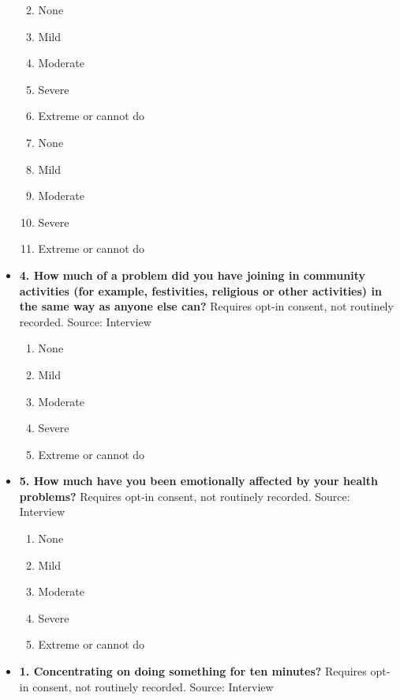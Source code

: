 \documentclass[
]{scrartcl}
\providecommand{\tightlist}{%
  \setlength{\itemsep}{0pt}\setlength{\parskip}{0pt}}\usepackage{longtable,booktabs,array}
\begin{document}
\begin{itemize}
  \begin{enumerate}
  \def\labelenumi{\arabic{enumi}.}
  \tightlist
  \item
    None
  \item
    Mild
  \item
    Moderate
  \item
    Severe
  \item
    Extreme or cannot do
  \item
    None
  \item
    Mild
  \item
    Moderate
  \item
    Severe
  \item
    Extreme or cannot do
  \end{enumerate}
\item
  \textbf{4. How much of a problem did you have joining in community
  activities (for example, festivities, religious or other activities)
  in the same way as anyone else can?} Requires opt-in consent, not
  routinely recorded. Source: Interview

  \begin{enumerate}
  \def\labelenumi{\arabic{enumi}.}
  \tightlist
  \item
    None
  \item
    Mild
  \item
    Moderate
  \item
    Severe
  \item
    Extreme or cannot do
  \end{enumerate}
\item
  \textbf{5. How much have you been emotionally affected by your health
  problems?} Requires opt-in consent, not routinely recorded. Source:
  Interview

  \begin{enumerate}
  \def\labelenumi{\arabic{enumi}.}
  \tightlist
  \item
    None
  \item
    Mild
  \item
    Moderate
  \item
    Severe
  \item
    Extreme or cannot do
  \end{enumerate}
\item
  \textbf{1. Concentrating on doing something for ten minutes?} Requires
  opt-in consent, not routinely recorded. Source: Interview


\end{itemize}
\end{document}
